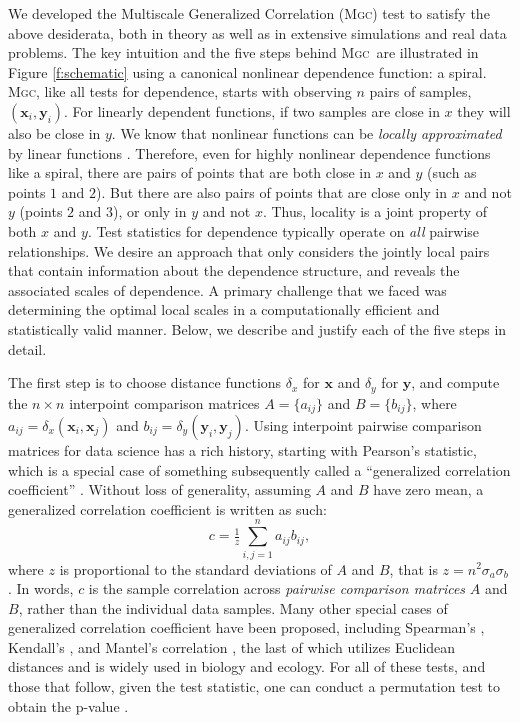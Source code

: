 \documentclass[11pt]{article}
\providecommand{\sct}[1]{{\normalfont\textsc{#1}}}
\providecommand{\mb}[1]{\boldsymbol{#1}}
\newcommand{\G}{c}
\newcommand{\Mgc}{\sct{Mgc}}
\newcommand{\mbx}{\ensuremath{\mb{x}}}
\newcommand{\mby}{\ensuremath{\mb{y}}}
\begin{document}
We developed the Multiscale Generalized Correlation (\Mgc) test to satisfy the above desiderata, both in theory as well as in extensive simulations and real data problems.
The key intuition and the five steps behind  \Mgc~are illustrated in Figure \ref{f:schematic} using a canonical nonlinear dependence function: a spiral.  
\Mgc, like all tests for dependence, starts with observing $n$ pairs of samples, $(\mbx_i,\mby_i)$.  
For linearly dependent functions, if two samples are close in $x$ they will also be close in $y$.
We know that nonlinear functions can be \emph{locally approximated} by linear functions \cite{Allard2012}.
Therefore, even for highly nonlinear dependence functions like a spiral, there are pairs of points that are both close in $x$ and $y$ (such as points $1$ and $2$).  
But there are also pairs of points that are close only in $x$ and not $y$  (points $2$ and $3$), or only in $y$ and not $x$.  
Thus, locality is a joint property of both $x$ and $y$.
Test statistics for dependence typically operate on \emph{all} pairwise relationships.  
We desire an approach that only considers the jointly local pairs that contain information about the dependence structure, and reveals the associated scales of dependence. 
A primary challenge that we faced was determining the optimal local scales in a computationally efficient and statistically valid manner. Below, we describe and justify each of the five steps in detail.


The first step is to choose  distance functions $\delta_x$ for $\mbx$ and $\delta_y$ for $\mb{y}$, and compute the $n \times n$ interpoint comparison matrices $A=\{a_{ij}\}$ and $B=\{b_{ij}\}$, where $a_{ij}=\delta_x(\mb{x}_i,\mb{x}_j)$ and  $b_{ij}=\delta_y(\mb{y}_i,\mb{y}_j)$.  
Using interpoint pairwise comparison matrices for data science has a rich history, starting with Pearson's statistic, which is a special case of something subsequently called a ``generalized correlation coefficient'' \cite{KendallBook}.
Without loss of generality, assuming $A$ and $B$ have zero mean, a generalized correlation coefficient is written as such:
\begin{equation}
\label{generalCoef}
\G= \tfrac{1}{z} {\textstyle \sum_{i,j=1}^n a_{ij} b_{ij}},
\end{equation}
where $z$ is proportional to the standard deviations of $A$ and $B$, that is $z=n^2\sigma_a \sigma_b$.
In words, $\G$ is the sample correlation across \emph{pairwise comparison matrices} $A$ and $B$, rather than the individual data samples.  
Many other special cases of generalized correlation coefficient have been proposed, including  Spearman's \cite{Spearman1904},  Kendall's \cite{KendallBook}, and Mantel's correlation \cite{Mantel1967}, the last of which utilizes Euclidean distances and is widely used in biology and ecology.
For all of these tests, and those that follow, given the test statistic, one can conduct a permutation test to obtain the p-value \cite{GoodPermutationBook}.
\end{document}
